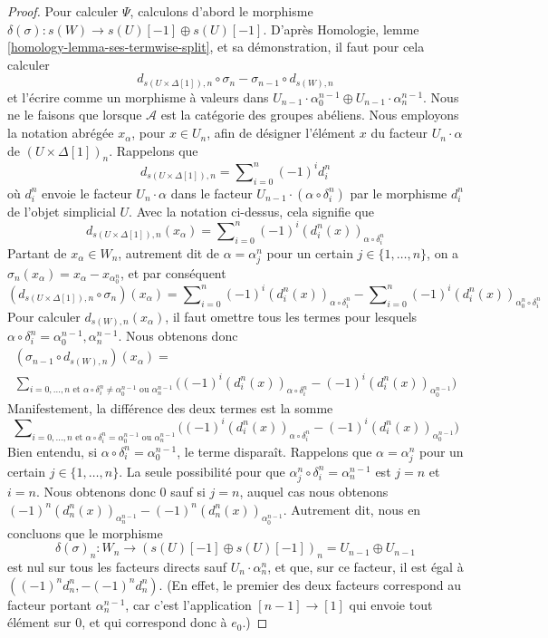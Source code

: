 \begin{proof}
\medskip\noindent
Pour calculer $\Psi$, calculons d'abord le morphisme
$\delta(\sigma) : s(W) \to s(U)[-1] \oplus s(U)[-1]$.
D'après Homologie, lemme \ref{homology-lemma-ses-termwise-split}, et sa
démonstration, il faut pour cela calculer
$$
d_{s(U \times \Delta[1]), n} \circ \sigma_n
-
\sigma_{n - 1} \circ d_{s(W), n}
$$
et l'écrire comme un morphisme à valeurs dans
$U_{n - 1} \cdot \alpha^{n - 1}_0 \oplus U_{n - 1} \cdot \alpha^{n - 1}_n$.
Nous ne le faisons que lorsque $\mathcal{A}$ est la catégorie des groupes
abéliens. Nous employons la notation abrégée $x_{\alpha}$, pour $x \in U_n$,
afin de désigner l'élément $x$ du facteur $U_n \cdot \alpha$ de
$(U \times \Delta[1])_n$. Rappelons que
$$
d_{s(U \times \Delta[1]), n}
=
\sum\nolimits_{i = 0}^n (-1)^i d^n_i
$$
où $d^n_i$ envoie le facteur $U_n \cdot \alpha$ dans le facteur
$U_{n - 1} \cdot (\alpha \circ \delta^n_i)$ par le morphisme $d^n_i$
de l'objet simplicial $U$. Avec la notation ci-dessus, cela signifie que
$$
d_{s(U \times \Delta[1]), n}(x_\alpha) =
\sum\nolimits_{i = 0}^n (-1)^i (d^n_i(x))_{\alpha \circ \delta^n_i}
$$
Partant de $x_\alpha \in W_n$, autrement dit de $\alpha = \alpha^n_j$
pour un certain $j \in \{1, \ldots, n\}$, on a
$\sigma_n(x_\alpha) = x_\alpha - x_{\alpha^n_0}$, et par conséquent
$$
(d_{s(U \times \Delta[1]), n} \circ \sigma_n)(x_\alpha)
=
\sum\nolimits_{i = 0}^n (-1)^i (d^n_i(x))_{\alpha \circ \delta^n_i}
-
\sum\nolimits_{i = 0}^n (-1)^i (d^n_i(x))_{\alpha^n_0 \circ \delta^n_i}
$$
Pour calculer $d_{s(W), n}(x_\alpha)$, il faut omettre tous les termes pour
lesquels $\alpha \circ \delta^n_i = \alpha^{n - 1}_0, \alpha^{n - 1}_n$.
Nous obtenons donc
$$
\begin{matrix}
(\sigma_{n - 1} \circ d_{s(W), n})(x_\alpha) = \\
\sum\nolimits_{i = 0, \ldots, n\text{ et }
\alpha \circ \delta^n_i \not = \alpha^{n - 1}_0\text{ ou }\alpha^{n - 1}_n}
\Big((-1)^i (d^n_i(x))_{\alpha \circ \delta^n_i}
-
(-1)^i (d^n_i(x))_{\alpha^{n - 1}_0}
\Big)
\end{matrix}
$$
Manifestement, la différence des deux termes est la somme
$$
\sum\nolimits_{i = 0, \ldots, n\text{ et }
\alpha \circ \delta^n_i = \alpha^{n - 1}_0\text{ ou }\alpha^{n - 1}_n}
\Big((-1)^i (d^n_i(x))_{\alpha \circ \delta^n_i}
-
(-1)^i (d^n_i(x))_{\alpha^{n - 1}_0}
\Big)
$$
Bien entendu, si $\alpha \circ \delta^n_i = \alpha^{n - 1}_0$,
le terme disparaît. Rappelons que $\alpha = \alpha^n_j$
pour un certain $j \in \{1, \ldots, n\}$. La seule possibilité pour que
$\alpha^n_j \circ \delta^n_i = \alpha^{n - 1}_n$ est
$j = n$ et $i = n$. Nous obtenons donc $0$ sauf si $j = n$, auquel cas
nous obtenons
$(-1)^n(d^n_n(x))_{\alpha^{n - 1}_n} - (-1)^n(d^n_n(x))_{\alpha^{n - 1}_0}$.
Autrement dit, nous en concluons que le morphisme
$$
\delta(\sigma)_n :
W_n
\to
(s(U)[-1] \oplus s(U)[-1])_n = U_{n - 1} \oplus U_{n - 1}
$$
est nul sur tous les facteurs directs sauf $U_n \cdot \alpha^n_n$, et que,
sur ce facteur, il est égal à $((-1)^nd^n_n, -(-1)^nd^n_n)$.
(En effet, le premier des deux facteurs correspond au facteur portant
$\alpha^{n - 1}_n$, car c'est l'application $[n - 1] \to [1]$ qui envoie
tout élément sur $0$, et qui correspond donc à $e_0$.)


\end{proof}
